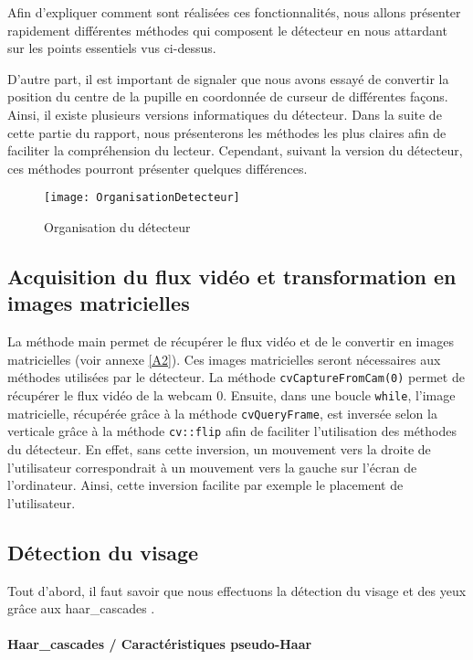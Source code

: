 Afin d’expliquer comment sont réalisées ces fonctionnalités, nous allons présenter rapidement différentes méthodes qui composent le détecteur en nous attardant sur les points essentiels vus ci-dessus.

D’autre part, il est important de signaler que nous avons essayé de convertir la position du centre de la pupille en coordonnée de curseur de différentes façons. Ainsi, il existe plusieurs versions informatiques du détecteur. Dans la suite de cette partie du rapport, nous présenterons les méthodes les plus claires afin de faciliter la compréhension du lecteur. Cependant, suivant la version du détecteur, ces méthodes pourront présenter quelques différences.

\begin{figure}[H]
  \centering
  \texttt{[image: OrganisationDetecteur]}
  \caption{Organisation du détecteur}
  \label{fig:OrganisationDetecteur}
\end{figure}

\subsection{Acquisition du flux vidéo et transformation en images matricielles}

La méthode main permet de récupérer le flux vidéo et de le convertir en images matricielles (voir annexe \ref{A2}). Ces images matricielles seront nécessaires aux méthodes utilisées par le détecteur. La méthode \lstinline=cvCaptureFromCam(0)= permet de récupérer le flux vidéo de la webcam 0. Ensuite, dans une boucle \lstinline=while=, l’image matricielle, récupérée grâce à la méthode \lstinline=cvQueryFrame=, est inversée selon la verticale grâce à la méthode \lstinline=cv::flip= afin de faciliter l’utilisation des méthodes du détecteur. En effet, sans cette inversion, un mouvement vers la droite de l’utilisateur correspondrait à un mouvement vers la gauche sur l’écran de l’ordinateur. Ainsi, cette inversion facilite par exemple le placement de l’utilisateur.

\subsection{Détection du visage}

Tout d’abord, il faut savoir que nous effectuons la détection du visage et des yeux grâce aux haar\_cascades  \cite{lienhart2002extended}\cite{viola2001rapid}.

\paragraph{Haar\_cascades / Caractéristiques pseudo-Haar}

